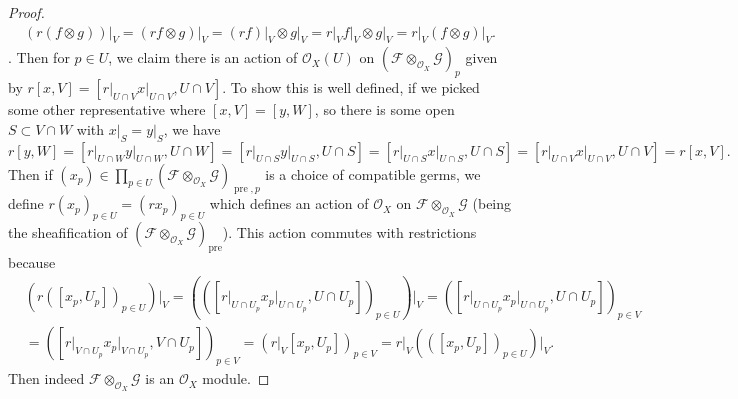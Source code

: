 \documentclass{article}
\newcommand{\fO}{\mathscr{O}}
\newcommand{\fF}{\mathscr{F}}
\newcommand{\fG}{\mathscr{G}}
\DeclareMathOperator{\pre}{pre}
\begin{document}
\begin{proof}
    \begin{align*}
        \left( r(f\otimes g) \right) \vert_V = (rf\otimes g)\vert_V = (rf)\vert_V \otimes g \vert_V = r\vert_V f\vert_V \otimes g \vert_V = r\vert_V (f \otimes g)\vert_V.
    \end{align*}
    \fi. Then for $p\in U$, we claim there is an action of $\fO_X(U)$ on $(\fF\otimes_{\fO_X} \fG)_p$ given by \newline $r[x,V] = [r\vert_{U\cap V} x\vert_{U\cap V},U\cap V]$. To show this is well defined, if we picked some other representative where $[x,V]=[y,W]$, so there is some open $S\subset V\cap W$ with $x\vert_S = y\vert_S$, we have
    \[
    r[y,W] = [r\vert_{U\cap W} y\vert_{U\cap W}, U\cap W]=[r\vert_{U\cap S} y\vert_{U\cap S}, U\cap S]=[r\vert_{U\cap S} x\vert_{U\cap S}, U\cap S]=[r\vert_{U\cap V} x\vert_{U\cap V},U\cap V] = r[x,V].
    \]
    Then if $(x_p)\in \prod_{p\in U} (\fF\otimes_{\fO_X} \fG)_{\pre,p}$ is a choice of compatible germs, we define $r(x_p)_{p\in U} = (rx_p)_{p\in U}$ which defines an action of $\fO_X$ on $\fF\otimes_{\fO_X} \fG$ (being the sheafification of $(\fF\otimes_{\fO_X} \fG)_{\pre}$). This action commutes with restrictions because
\begin{align*}
    &\left( r([x_p, U_p])_{p\in U}\right) \vert_{V} = \left( ([r\vert_{U\cap U_p} x_p \vert_{U\cap U_p}, U\cap U_p])_{p\in U} \right) \vert_V=([r\vert_{U\cap U_p} x_p \vert_{U\cap U_p}, U\cap U_p])_{p\in V}\\
    &=([r\vert_{V\cap U_p} x_p \vert_{V\cap U_p}, V\cap U_p])_{p\in V}=  (r\vert_V[x_p ,U_p])_{p\in V} = r\vert_V \left( ([x_p,U_p])_{p\in U}\right)\vert_{V}.
\end{align*}
    Then indeed $\fF \otimes_{\fO_X} \fG$ is an $\fO_X$ module.
    

\end{proof}
\end{document}
